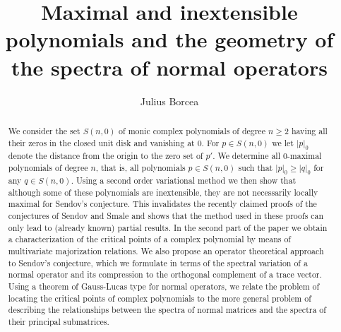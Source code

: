 \documentclass[10pt,twoside,a4paper,reqno]{amsart}
\theoremstyle{plain}
\theoremstyle{definition}
\begin{document}

\title[Maximal and inextensible polynomials]{Maximal and inextensible 
polynomials and the geometry of the spectra of normal operators}
\author[Julius Borcea]{Julius Borcea}
\address{Department of Mathematics, Stockholm University, SE-106 91 
Stockholm, Sweden}

\begin{abstract}
We consider the set $S(n,0)$ of monic complex polynomials of degree 
$n\ge 2$ having all their zeros in the closed unit disk and vanishing at 0.
For $p\in S(n,0)$ we let $|p|_{0}$ denote the distance from the 
origin to the zero set of $p'$. We determine all 0-maximal polynomials of 
degree $n$, that is, all polynomials $p\in S(n,0)$ such that 
$|p|_{0}\ge |q|_{0}$ for any 
$q\in S(n,0)$. Using a second order variational method we then 
show that although some of these polynomials are inextensible, they are not 
necessarily locally maximal for Sendov's conjecture. This invalidates the 
recently claimed proofs of the conjectures of Sendov and Smale and shows that 
the method used in these proofs can only lead to (already known) partial 
results. In the second part of the paper we obtain a 
characterization of the critical points of a complex polynomial by means of 
multivariate majorization relations. We also propose an operator 
theoretical approach to Sendov's conjecture, which we formulate in terms of 
the spectral variation of a normal operator and its compression to the 
orthogonal complement of a trace vector. Using a theorem of Gauss-Lucas type 
for normal operators, we relate the problem of locating the critical points 
of complex polynomials to the more general problem of describing the 
relationships between the spectra of normal matrices and the spectra of their 
principal submatrices.
\end{abstract}

\maketitle
\end{document}

